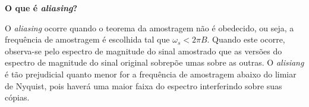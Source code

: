 \textbf{O que é \textit{aliasing}?}

O \textit{aliasing} ocorre quando o teorema da amostragem não é obedecido, ou seja, a frequência de amostragem é escolhida tal que $\omega_s<2\pi B$. Quando este ocorre, observa-se pelo espectro de magnitude do sinal amostrado que as versões do espectro de magnitude do sinal original sobrepõe umas sobre as outras. O \textit{alisiang} é tão prejudicial quanto menor for a frequência de amostragem abaixo do limiar de Nyquist, pois haverá uma maior faixa do espectro interferindo sobre suas cópias.

